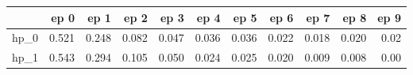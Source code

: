 \begin{tabular}{lrrrrrrrrrr}
\toprule
{} &   ep 0 &   ep 1 &   ep 2 &   ep 3 &   ep 4 &   ep 5 &   ep 6 &   ep 7 &   ep 8 &  ep 9 \\
\midrule
hp\_0 &  0.521 &  0.248 &  0.082 &  0.047 &  0.036 &  0.036 &  0.022 &  0.018 &  0.020 &  0.02 \\
hp\_1 &  0.543 &  0.294 &  0.105 &  0.050 &  0.024 &  0.025 &  0.020 &  0.009 &  0.008 &  0.00 \\
\bottomrule
\end{tabular}
